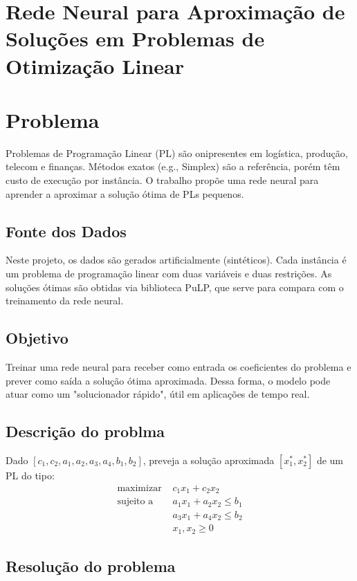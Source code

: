 \documentclass[12pt, a4paper]{article}
\begin{document}
\section{Rede Neural para Aproximação de Soluções em Problemas de Otimização Linear}

\section*{Problema}
Problemas de Programação Linear (PL) são onipresentes em logística, produção, telecom e finanças. Métodos exatos (e.g., Simplex) são a referência, porém têm custo de execução por instância. O trabalho propõe uma rede neural para aprender a aproximar a solução ótima de PLs pequenos.


\subsection{Fonte dos Dados}

Neste projeto, os dados são gerados artificialmente (sintéticos). Cada instância é um problema de programação linear com duas variáveis e duas restrições. As soluções ótimas são obtidas via biblioteca PuLP, que serve para compara com o treinamento da rede neural.

\subsection{Objetivo}
Treinar uma rede neural para receber como entrada os coeficientes do problema e prever como saída a solução ótima aproximada. Dessa forma, o modelo pode atuar como um "solucionador rápido", útil em aplicações de tempo real.

\subsection{Descrição do problma}

Dado $[c_1, c_2, a_1, a_2, a_3, a_4, b_1, b_2]$, preveja a solução aproximada $[x_1^*, x_2^*]$ de um PL do tipo:
\begin{align*}
\text{maximizar } & c_1x_1 + c_2x_2 \\
\text{sujeito a } & a_1x_1 + a_2x_2 \leq b_1 \\
& a_3x_1 + a_4x_2 \leq b_2 \\
& x_1, x_2 \geq 0
\end{align*}

\subsection{Resolução do problema}
\end{document}
